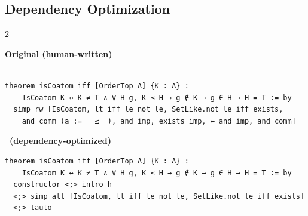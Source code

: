 \label{app:qual_improver2}



\subsection{Dependency Optimization}

{

\setlength{\columnsep}{0.2cm}
\begin{paracol}{2}
{
\textbf{Original (human-written)}
\begin{lstlisting}[basicstyle=\tiny\ttfamily]

theorem isCoatom_iff [OrderTop A] {K : A} :
    IsCoatom K ↔ K ≠ T ∧ ∀ H g, K ≤ H → g ∉ K → g ∈ H → H = T := by
  simp_rw [IsCoatom, lt_iff_le_not_le, SetLike.not_le_iff_exists,
    and_comm (a := _ ≤ _), and_imp, exists_imp, ← and_imp, and_comm]
\end{lstlisting}
}
\switchcolumn
{
\textbf{\ImProver \ (dependency-optimized)}
\begin{lstlisting}[basicstyle=\tiny\ttfamily]
theorem isCoatom_iff [OrderTop A] {K : A} :
    IsCoatom K ↔ K ≠ T ∧ ∀ H g, K ≤ H → g ∉ K → g ∈ H → H = T := by
  constructor <;> intro h
  <;> simp_all [IsCoatom, lt_iff_le_not_le, SetLike.not_le_iff_exists]
  <;> tauto
\end{lstlisting}
}

\end{paracol}
\label{fig:improver2-dep-isCoatom}
}






